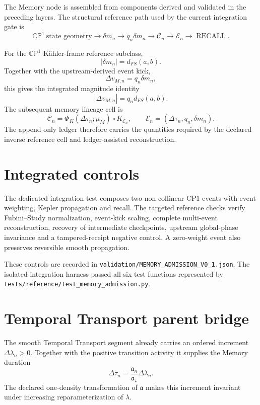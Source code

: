 The Memory node is assembled from components derived and validated in the preceding layers. The structural reference path used by the current integration gate is
\[
\boxed{
\mathbb{CP}^1\ \text{state geometry}
\longrightarrow
\delta m_n
\longrightarrow
q_n\delta m_n
\longrightarrow
\mathcal C_n
\longrightarrow
\mathcal E_n
\longrightarrow
\operatorname{RECALL}.
}
\]

For the \(\mathbb{CP}^1\) K\"ahler-frame reference subclass,
\[
|\delta m_n|=d_{FS}(a,b).
\]
Together with the upstream-derived event kick,
\[
\Delta v_{M,n}=q_n\delta m_n,
\]
this gives the integrated magnitude identity
\[
\boxed{
|\Delta v_{M,n}|=q_n d_{FS}(a,b).
}
\]
The subsequent memory lineage cell is
\[
\mathcal C_n
=\Phi_K(\Delta\tau_n;\mu_M)\circ K_{\mathcal E_n},
\qquad
\mathcal E_n=(\Delta\tau_n,q_n,\delta m_n).
\]
The append-only ledger therefore carries the quantities required by the declared inverse reference cell and ledger-assisted reconstruction.

\section{Integrated controls}

The dedicated integration test composes two non-collinear CP1 events with event weighting, Kepler propagation and recall. The targeted reference checks verify Fubini--Study normalization, event-kick scaling, complete multi-event reconstruction, recovery of intermediate checkpoints, upstream global-phase invariance and a tampered-receipt negative control. A zero-weight event also preserves reversible smooth propagation.

These controls are recorded in
\texttt{validation/MEMORY\_ADMISSION\_V0\_1.json}.
The isolated integration harness passed all six test functions represented by
\texttt{tests/reference/test\_memory\_admission.py}.

\section{Temporal Transport parent bridge}

The smooth Temporal Transport segment already carries an ordered increment \(\Delta\lambda_n>0\). Together with the positive transition activity it supplies the Memory duration
\[
\boxed{
\Delta\tau_n
=\frac{\mathfrak a_n}{\mathfrak a_\star}\Delta\lambda_n.
}
\]
The declared one-density transformation of \(\mathfrak a\) makes this increment invariant under increasing reparameterization of \(\lambda\).

